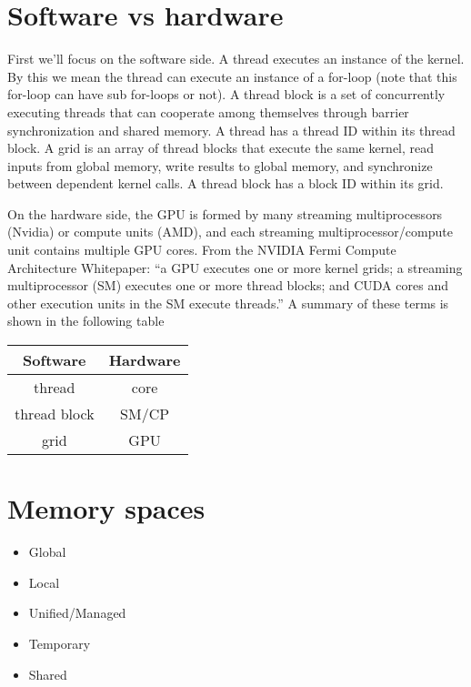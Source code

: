 \documentclass[a4paper,11pt]{article}
\begin{document}
\section{Software vs hardware}
First we'll focus on the software side. A thread executes an instance of the kernel. By this we mean the thread can execute an instance of a for-loop (note that this for-loop can have sub for-loops or not). A thread block is a set of concurrently executing threads that can cooperate among themselves through barrier synchronization and shared memory. A thread has a thread ID within its thread block. A grid is an array of thread blocks that execute the same kernel, read inputs from global memory, write results to global memory, and synchronize between dependent kernel calls. A thread block has a block ID within its grid.

On the hardware side, the GPU is formed by many streaming multiprocessors (Nvidia) or compute units (AMD), and each streaming multiprocessor/compute unit contains multiple GPU cores. From the NVIDIA Fermi Compute Architecture Whitepaper:
``a GPU executes one or more kernel grids; a streaming multiprocessor (SM) executes one or more thread blocks;
and CUDA cores and other execution units in the SM execute threads.'' A summary of these terms is shown in the following table

\begin{center}
    \begin{tabular}{c | c }
        Software & Hardware \\
        \hline
        thread & core \\ 
        thread block & SM/CP \\
        grid & GPU \\
    \end{tabular}
\end{center}

\section{Memory spaces}
\begin{itemize}
    \item Global
    \item Local
    \item Unified/Managed
    \item Temporary
    \item Shared
\end{itemize}
\end{document}
